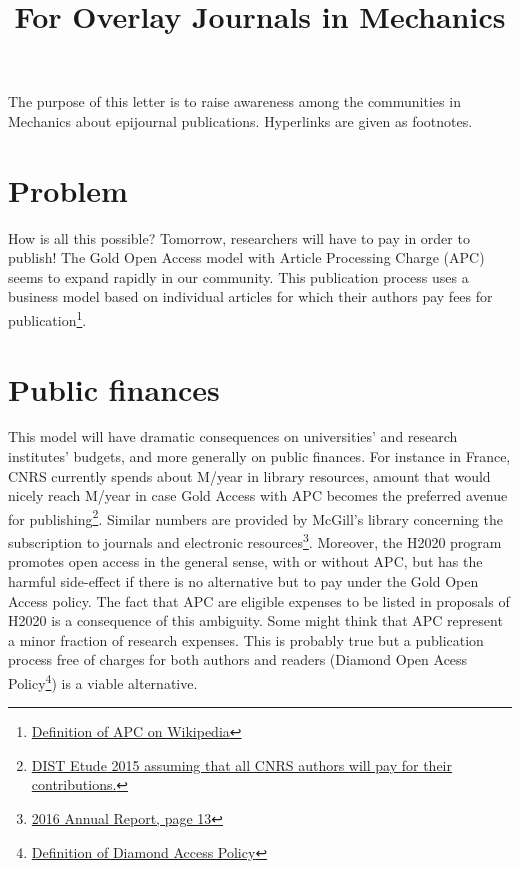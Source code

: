 \documentclass[11pt]{article}
\title{For Overlay Journals in Mechanics}
\begin{document}
\maketitle
\noindent The purpose of this letter is to raise awareness among the communities in Mechanics about epijournal publications. Hyperlinks are given as footnotes.
\section*{Problem}
How is all this possible? Tomorrow, researchers will have to pay in order to publish! The Gold Open Access model with Article Processing Charge (APC) seems to expand rapidly in our community. This publication process uses a business model based on individual articles for which their authors pay fees for publication\footnote{\href{https://en.wikipedia.org/wiki/Article_processing_charge}{Definition of APC on Wikipedia}}.

\section*{Public finances}
This model will have dramatic consequences on universities' and research institutes' budgets, and more generally on public finances. For instance in France, CNRS currently spends about M/year in library resources, amount that would nicely reach M/year in case Gold Access with APC becomes the preferred avenue for publishing\footnote{\href{http://www.cnrs.fr/dist/z-outils/documents/Distinfo2/DISTetude_4.pdf}{DIST Etude 2015 assuming that all CNRS authors will pay for their contributions.}}. Similar numbers are provided by McGill's library concerning the subscription to journals and electronic resources\footnote{\href{http://www.mcgill.ca/library/files/library/mcgill_library_and_archives_-_annual_report_2016_0.pdf}{2016 Annual Report, page 13}}. Moreover, the H2020 program promotes open access in the general sense, with or without APC, but has the harmful side-effect if there is no alternative  but to pay under the Gold Open Access policy. The fact that APC are eligible expenses to be listed in proposals of H2020 is a consequence of this ambiguity.
Some might think that APC represent a minor fraction of research expenses. This is probably true but a publication process free of charges for both authors and readers (Diamond Open Acess Policy\footnote{\href{https://en.wikipedia.org/wiki/Open_access_journal}{Definition of Diamond Access Policy}}) is a viable alternative.
\end{document}
